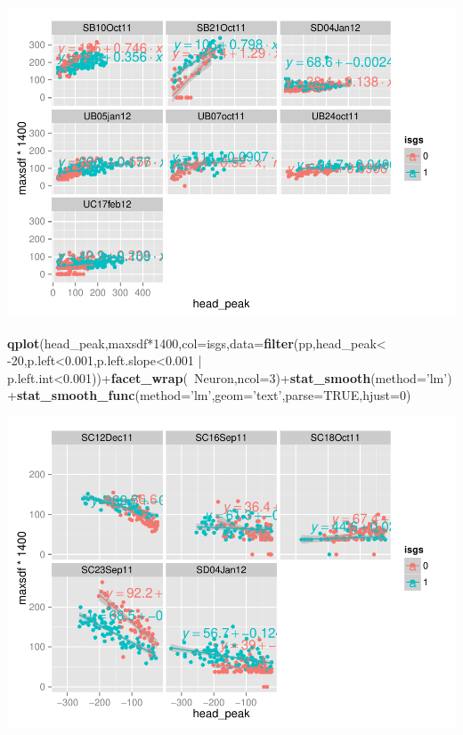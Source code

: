 \documentclass[]{article}
\newenvironment{Shaded}{\begin{snugshade}}{\end{snugshade}}
\newcommand{\KeywordTok}[1]{\textcolor[rgb]{0.13,0.29,0.53}{\textbf{{#1}}}}
\newcommand{\DataTypeTok}[1]{\textcolor[rgb]{0.13,0.29,0.53}{{#1}}}
\newcommand{\DecValTok}[1]{\textcolor[rgb]{0.00,0.00,0.81}{{#1}}}
\newcommand{\FloatTok}[1]{\textcolor[rgb]{0.00,0.00,0.81}{{#1}}}
\newcommand{\StringTok}[1]{\textcolor[rgb]{0.31,0.60,0.02}{{#1}}}
\newcommand{\OtherTok}[1]{\textcolor[rgb]{0.56,0.35,0.01}{{#1}}}
\newcommand{\NormalTok}[1]{{#1}}
\begin{document}
\includegraphics{ExtraFigs_files/figure-latex/gspsAnalysis-1.pdf}

\begin{Shaded}
\begin{Highlighting}[]
\KeywordTok{qplot}\NormalTok{(head_peak,maxsdf*}\DecValTok{1400}\NormalTok{,}\DataTypeTok{col=}\NormalTok{isgs,}\DataTypeTok{data=}\KeywordTok{filter}\NormalTok{(pp,head_peak<}\StringTok{ }\NormalTok{-}\DecValTok{20}\NormalTok{,p.left<}\FloatTok{0.001}\NormalTok{,p.left.slope<}\FloatTok{0.001} \NormalTok{|}\StringTok{ }\NormalTok{p.left.int<}\FloatTok{0.001}\NormalTok{))+}\KeywordTok{facet_wrap}\NormalTok{(~Neuron,}\DataTypeTok{ncol=}\DecValTok{3}\NormalTok{)+}\KeywordTok{stat_smooth}\NormalTok{(}\DataTypeTok{method=}\StringTok{'lm'}\NormalTok{)+}\KeywordTok{stat_smooth_func}\NormalTok{(}\DataTypeTok{method=}\StringTok{'lm'}\NormalTok{,}\DataTypeTok{geom=}\StringTok{'text'}\NormalTok{,}\DataTypeTok{parse=}\OtherTok{TRUE}\NormalTok{,}\DataTypeTok{hjust=}\DecValTok{0}\NormalTok{)}
\end{Highlighting}
\end{Shaded}

\includegraphics{ExtraFigs_files/figure-latex/gspsAnalysis-2.pdf}
\end{document}
